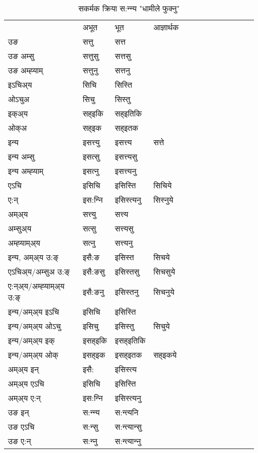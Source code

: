 \begin{table}[H]
\centering
\caption{\label{itt.vt} सकर्मक क्रिया  स:न्‍न्य  "धामीले फुक्नु"  }
\begin{tabular}{l|l|l|l|l|l|l|l|l|l|l|l|l}  \toprule
&अभूत & भूत & आज्ञार्थक \\ 
उङ &सत्तु &सत्त \\ 
उङ अम्सु&सत्तुसु &सत्तसु \\ 
उङ अम्ह्‍याम्&सत्तुनु &सत्तनु \\ 
इऽचिअ्य &सिचि &सिस्ति   \\ 
ओऽचुअ        &सिचु &सिस्तु   \\ 
इक्अ्य&सह्इकि &सह्इतिकि   \\ 
ओक्अ &सह्इक &सह्इतक   \\ 
इन्य & इसत्त्यु  & इसत्त्य &सत्ते  \\ 
इन्य अम्सु& इसत्सु  & इसत्त्यसु   \\ 
इन्य अम्ह्‍याम्& इसत्‍नु  & इसत्त्यनु   \\ 
एऽचि & इसिचि & इसिस्ति &सिचिये    \\ 
ए:न् & इस:न्‍नि  & इसिस्त्यनु &सिस्‍नुये  \\ 
अम्अ्य & सत्त्यु  & सत्त्य  \\ 
अम्सुअ्य & सत्सु & सत्त्यसु  \\ 
अम्ह्‍याम्अ्य & सत्‍नु  & सत्त्यनु \\ 
\midrule
इन्य, अम्अ्य उ:ङ्‌ &इसै:ङ &इसिस्त &सिचये \\ 
एऽचिअ्य/अम्सुअ उ:ङ्‌ &इसै:ङसु &इसिस्तसु &सिचसुये \\ 
ए:न्अ्य/अम्ह्‍याम्अ्य उ:ङ्‌ &इसै:ङनु &इसिस्तनु &सिचनुये \\ 
इन्य/अम्अ्य इऽचि &इसिचि &इसिस्ति    \\ 
इन्य/अम्अ्य ओऽचु &इसिचु &इसिस्तु  &सिचुये  \\ 
इन्य/अम्अ्य इक् &इसह्इकि &इसह्इतिकि   \\ 
इन्य/अम्अ्य ओक् &इसह्इक &इसह्इतक  &सह्इकये  \\ 
अम्अ्य इन् & इसै: & इसिस्त्य   \\ 
अम्अ्य एऽचि & इसिचि & इसिस्ति    \\ 
अम्अ्य ए:न् & इस:न्‍नि  & इसिस्त्यनु  \\ 
\midrule
उङ इन् & स:न्‍न्य  & स:न्त्यनि  \\ 
उङ एऽचि & स:न्सु  & स:न्त्यान्सु   \\ 
उङ ए:न्& स:न्‍नु  & स:न्त्यान्‍नु   \\ 
\bottomrule
\end{tabular}
\end{table}


